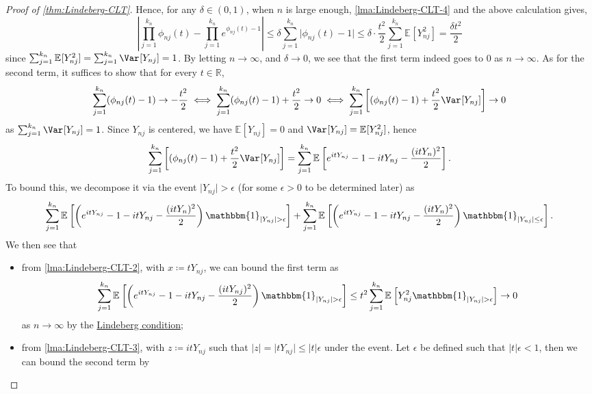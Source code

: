 \begin{proof}[Proof of \autoref{thm:Lindeberg-CLT}]
	Hence, for any \(\delta \in (0, 1)\), when \(n\) is large enough, \autoref{lma:Lindeberg-CLT-4} and the above calculation gives,
	\[
		\left\vert \prod_{j=1}^{k_n} \phi _{nj}(t) - \prod_{j=1}^{k_n} e^{\phi _{nj}(t) - 1} \right\vert
		\leq \delta \sum_{j=1}^{k_n} \vert \phi _{nj}(t) - 1 \vert
		\leq \delta \cdot \frac{t^2}{2} \sum_{j=1}^{k_n} \mathbb{E}_{}[Y_{nj}^2]
		= \frac{\delta t^2}{2}
	\]
	since \(\sum_{j=1}^{k_n} \mathbb{E}_{}[Y_{nj}^2] = \sum_{j=1}^{k_n} \Var_{}[Y_{nj}] = 1\). By letting \(n \to \infty \), and \(\delta \to 0\), we see that the first term indeed goes to \(0\) as \(n \to \infty \). As for the second term, it suffices to show that for every \(t \in \mathbb{R} \),
	\[
		\sum_{j=1}^{k_n} (\phi _{nj}(t) - 1) \to - \frac{t^2}{2}
		\iff \sum_{j=1}^{k_n} (\phi _{nj}(t) - 1) + \frac{t^2}{2} \to 0
		\iff \sum_{j=1}^{k_n} \left[ (\phi _{nj}(t) - 1) + \frac{t^2}{2} \Var_{}[Y_{nj}] \right] \to 0
	\]
	as \(\sum_{j=1}^{k_n} \Var_{}[Y_{nj}] = 1\). Since \(Y_{nj}\) is centered, we have \(\mathbb{E}_{}[Y_{nj}] = 0\) and \(\Var_{}[Y_{nj}] = \mathbb{E}_{}[Y_{nj}^2] \), hence
	\[
		\sum_{j=1}^{k_n} \left[ (\phi _{nj}(t) - 1) + \frac{t^2}{2} \Var_{}[Y_{nj}] \right]
		= \sum_{j=1}^{k_n} \mathbb{E}_{}\left[e^{i t Y_{nj}} - 1 - i t Y_{nj} - \frac{(i t Y_n)^2}{2} \right].
	\]
	To bound this, we decompose it via the event \(\vert Y_{nj} \vert > \epsilon \) (for some \(\epsilon > 0\) to be determined later) as
	\[
		\sum_{j=1}^{k_n} \mathbb{E}_{}\left[\left( e^{i t Y_{nj}} - 1 - i t Y_{nj} - \frac{(i t Y_n)^2}{2} \right) \mathbbm{1}_{\vert Y_{nj} \vert > \epsilon } \right]
		+ \sum_{j=1}^{k_n} \mathbb{E}_{}\left[\left( e^{i t Y_{nj}} - 1 - i t Y_{nj} - \frac{(i t Y_n)^2}{2} \right) \mathbbm{1}_{\vert Y_{nj} \vert \leq \epsilon } \right].
	\]
	We then see that
	\begin{itemize}
		\item from \autoref{lma:Lindeberg-CLT-2}, with \(x \coloneqq t Y_{nj}\), we can bound the first term as
		      \[
			      \sum_{j=1}^{k_n} \mathbb{E}_{}\left[\left( e^{i t Y_{nj}} - 1 - i t Y_{nj} - \frac{(i t Y_{nj})^2}{2} \right) \mathbbm{1}_{\vert Y_{nj} \vert > \epsilon } \right]
			      \leq t^2 \sum_{j=1}^{k_n} \mathbb{E}_{}\left[Y_{nj}^2 \mathbbm{1}_{\vert Y_{nj} \vert > \epsilon } \right]
			      \to 0
		      \]
		      as \(n\to \infty \) by the \hyperref[def:Lindeberg-condition]{Lindeberg condition};
		\item from \autoref{lma:Lindeberg-CLT-3}, with \(z \coloneqq i t Y_{nj}\) such that \(\vert z \vert = \vert t Y_{nj} \vert \leq \vert t \vert \epsilon \) under the event. Let \(\epsilon \) be defined such that \(\vert t \vert \epsilon < 1\), then we can bound the second term by

\end{itemize}
\end{proof}
